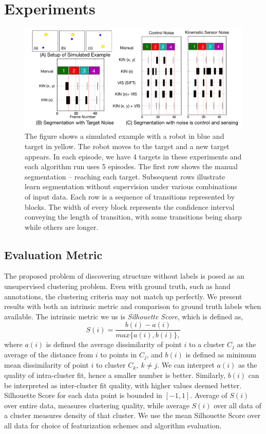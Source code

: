 \section{Experiments}

\begin{figure}[!t]
\centering
\includegraphics[width=0.8\linewidth]{figures/toyEx}
\caption{The figure shows a simulated example with a robot in blue and target in yellow. The robot moves to the target and a new target appears. In each episode, we have 4 targets in these experiments and each algorithm run uses 5 episodes. The first row shows the manual segmentation -- reaching each target. Subsequent rows illustrate learn segmentation without supervision under various combinations of input data.  
Each row is a sequence of transitions represented by blocks. The width of every block represents the confidence interval conveying the length of transition, with some transitions being sharp while others are longer.}
\label{fig:toyEx}
\vspace{-15pt}
\end{figure}


\subsection{Evaluation Metric}
The proposed problem of discovering structure without labels is posed as an unsupervised clustering problem. 
Even with ground truth, such as hand annotations, the clustering criteria may not match up perfectly.
We present results with both an intrinsic metric and comparison to ground truth labels when available.
The intrinsic metric we us is \textit{Silhouette Score}, which is defined as,  \vspace{-5pt}
\[ S(i) = \frac{b(i) - a(i)}{max\{a(i), b(i)\},}
\]
where $a(i)$ is defined the average dissimilarity of point $i$ to a cluster $C_j$ as the average of the distance from $i$ to points in $C_j$, and $b(i)$ is defined as minimum mean dissimilarity of point $i$ to cluster $C_k,\ k\neq j$. We can interpret $a(i)$ as the quality of intra-cluster fit, hence a smaller number is better. Similarly, $b(i)$ can be interpreted as inter-cluster fit quality, with higher values deemed better. 
Silhouette Score for each data point is bounded in $[-1, 1]$. Average of $S(i)$ over entire data, measures clustering quality, while average $S(i)$ over all data of a cluster measures density of that cluster. 
We use the mean Silhouette Score over all data for choice of featurization schemes and algorithm evaluation.

